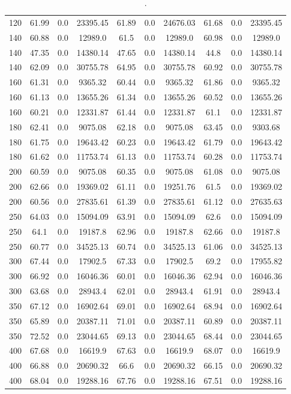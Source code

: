 \begin{table}[!h]
\begin{tabular}{lccccccccc}
120 & 61.99 & 0.0 & 23395.45 & 61.89 & 0.0 & 24676.03 & 61.68 & 0.0 & 23395.45 \\
140 & 60.88 & 0.0 & 12989.0 & 61.5 & 0.0 & 12989.0 & 60.98 & 0.0 & 12989.0 \\
140 & 47.35 & 0.0 & 14380.14 & 47.65 & 0.0 & 14380.14 & 44.8 & 0.0 & 14380.14 \\
140 & 62.09 & 0.0 & 30755.78 & 64.95 & 0.0 & 30755.78 & 60.92 & 0.0 & 30755.78 \\
160 & 61.31 & 0.0 & 9365.32 & 60.44 & 0.0 & 9365.32 & 61.86 & 0.0 & 9365.32 \\
160 & 61.13 & 0.0 & 13655.26 & 61.34 & 0.0 & 13655.26 & 60.52 & 0.0 & 13655.26 \\
160 & 60.21 & 0.0 & 12331.87 & 61.44 & 0.0 & 12331.87 & 61.1 & 0.0 & 12331.87 \\
180 & 62.41 & 0.0 & 9075.08 & 62.18 & 0.0 & 9075.08 & 63.45 & 0.0 & 9303.68 \\
180 & 61.75 & 0.0 & 19643.42 & 60.23 & 0.0 & 19643.42 & 61.79 & 0.0 & 19643.42 \\
180 & 61.62 & 0.0 & 11753.74 & 61.13 & 0.0 & 11753.74 & 60.28 & 0.0 & 11753.74 \\
200 & 60.59 & 0.0 & 9075.08 & 60.35 & 0.0 & 9075.08 & 61.08 & 0.0 & 9075.08 \\
200 & 62.66 & 0.0 & 19369.02 & 61.11 & 0.0 & 19251.76 & 61.5 & 0.0 & 19369.02 \\
200 & 60.56 & 0.0 & 27835.61 & 61.39 & 0.0 & 27835.61 & 61.12 & 0.0 & 27635.63 \\
250 & 64.03 & 0.0 & 15094.09 & 63.91 & 0.0 & 15094.09 & 62.6 & 0.0 & 15094.09 \\
250 & 64.1 & 0.0 & 19187.8 & 62.96 & 0.0 & 19187.8 & 62.66 & 0.0 & 19187.8 \\
250 & 60.77 & 0.0 & 34525.13 & 60.74 & 0.0 & 34525.13 & 61.06 & 0.0 & 34525.13 \\
300 & 67.44 & 0.0 & 17902.5 & 67.33 & 0.0 & 17902.5 & 69.2 & 0.0 & 17955.82 \\
300 & 66.92 & 0.0 & 16046.36 & 60.01 & 0.0 & 16046.36 & 62.94 & 0.0 & 16046.36 \\
300 & 63.68 & 0.0 & 28943.4 & 62.01 & 0.0 & 28943.4 & 61.91 & 0.0 & 28943.4 \\
350 & 67.12 & 0.0 & 16902.64 & 69.01 & 0.0 & 16902.64 & 68.94 & 0.0 & 16902.64 \\
350 & 65.89 & 0.0 & 20387.11 & 71.01 & 0.0 & 20387.11 & 60.89 & 0.0 & 20387.11 \\
350 & 72.52 & 0.0 & 23044.65 & 69.13 & 0.0 & 23044.65 & 68.44 & 0.0 & 23044.65 \\
400 & 67.68 & 0.0 & 16619.9 & 67.63 & 0.0 & 16619.9 & 68.07 & 0.0 & 16619.9 \\
400 & 66.88 & 0.0 & 20690.32 & 66.6 & 0.0 & 20690.32 & 66.15 & 0.0 & 20690.32 \\
400 & 68.04 & 0.0 & 19288.16 & 67.76 & 0.0 & 19288.16 & 67.51 & 0.0 & 19288.16 \\
\bottomrule
\end{tabular}
\caption{.}
\label{tab:init_senarios}
\end{table}
